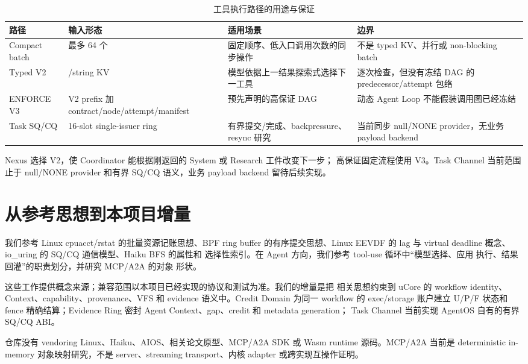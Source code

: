\begin{table}[htbp]
\centering
\caption{工具执行路径的用途与保证}
\label{tab:tool-paths}
\begin{tabularx}{\textwidth}{L{2.3cm}L{3.0cm}YY}
\toprule
\textbf{路径} & \textbf{输入形态} & \textbf{适用场景} & \textbf{边界} \\
\midrule
Compact batch & 最多 64 个  & 固定顺序、低入口调用次数的同步操作 &
不是 typed KV、并行或 non-blocking batch \\
Typed V2 & /string KV & 模型依据上一结果探索式选择下一工具 &
逐次检查，但没有冻结 DAG 的 predecessor/attempt 包络 \\
ENFORCE V3 & V2 prefix 加 contract/node/attempt/manifest & 预先声明的高保证 DAG &
动态 Agent Loop 不能假装调用图已经冻结 \\
Task SQ/CQ & 16-slot single-issuer ring & 有界提交/完成、backpressure、resync 研究 &
当前同步 null/NONE provider，无业务 payload backend \\
\bottomrule
\end{tabularx}
\end{table}

Nexus 选择 V2，使 Coordinator 能根据刚返回的 System 或 Research 工件改变下一步；
高保证固定流程使用 V3。Task Channel 当前范围止于 null/NONE provider 和有界 SQ/CQ
语义，业务 payload backend 留待后续实现。

\section{从参考思想到本项目增量}

我们参考 Linux cpuacct/rstat 的批量资源记账思想\cite{linuxcpuacct,linuxrstat}、BPF
ring buffer 的有序提交思想\cite{bpfring}、Linux EEVDF 的 lag 与 virtual deadline
概念\cite{eevdf}、io\_uring 的 SQ/CQ 通信模型\cite{iouring}、Haiku BFS 的属性和
选择性索引\cite{haikubfs}。在 Agent 方向，我们参考 tool-use 循环中“模型选择、应用
执行、结果回灌”的职责划分\cite{anthropictools,claudeloop}，并研究 MCP/A2A 的对象
形状\cite{mcp2026,a2av1}。

这些工作提供概念来源；兼容范围以本项目已经实现的协议和测试为准。我们的增量是把
相关思想约束到 uCore 的 workflow identity、Context、capability、provenance、VFS 和
evidence 语义中。Credit Domain 为同一 workflow 的 exec/storage 账户建立 U/P/F 状态和
fence 精确结算；Evidence Ring 密封 Agent Context、gap、credit 和 metadata generation；
Task Channel 当前实现 AgentOS 自有的有界 SQ/CQ ABI。

\begin{boundarybox}[原创与互操作边界]
仓库没有 vendoring Linux、Haiku、AIOS、相关论文原型、MCP/A2A SDK 或 Wasm runtime
源码。MCP/A2A 当前是 deterministic in-memory 对象映射研究，不是 server、streaming
transport、内核 adapter 或跨实现互操作证明。
\end{boundarybox}

